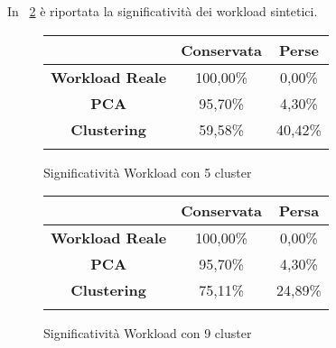 \vspace{5 mm}

In \figurename~\ref{significativita_workload} è riportata la significatività
dei workload sintetici.\\

\vspace{5 mm}

\begin{figure}[!htbp]
  \begin{tabular}{c|c|c|}
   & \textbf{Conservata} & \textbf{Perse} \\
   \hline
   \textbf{Workload Reale} & 100,00\% &	0,00\% \\
   \hline
   \textbf{PCA} &	95,70\%	& 4,30\% \\
   \hline
   \textbf{Clustering} &	59,58\%	& 40,42\% \\
   \hline
   \label{significativita_workload}
  \end{tabular}
  \caption{Significatività Workload con 5 cluster}
\end{figure}

\vspace{5 mm}

\begin{figure}[!htbp]
  \begin{tabular}{c|c|c|}
   & \textbf{Conservata} & \textbf{Persa} \\
   \hline
   \textbf{Workload Reale} & 100,00\% &	0,00\% \\
   \hline
   \textbf{PCA} &	95,70\%	& 4,30\% \\
   \hline
   \textbf{Clustering} &	75,11\%	& 24,89\% \\
   \hline
   \label{significativita_workload}
  \end{tabular}
  \caption{Significatività Workload con 9 cluster}
\end{figure}

\vspace{5 mm}

